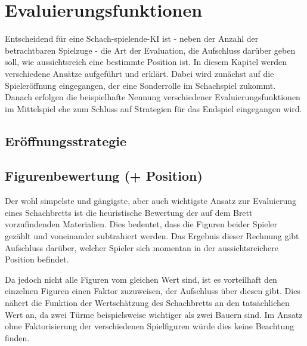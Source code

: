  

   
   

\section{Evaluierungsfunktionen}

Entscheidend für eine Schach-spielende-KI ist - neben der Anzahl der betrachtbaren Spielzuge - die Art der Evaluation, die Aufschluss darüber geben soll, wie aussichtsreich eine bestimmte Position ist. In diesem Kapitel werden verschiedene Ansätze aufgeführt und erklärt. Dabei wird zunächst auf die Spieleröffnung eingegangen, der eine Sonderrolle im Schachspiel zukommt. Danach erfolgen die beispielhafte Nennung verschiedener Evaluierungsfunktionen im Mittelspiel ehe zum Schluss auf Strategien für das Endspiel eingegangen wird.

\subsection{Eröffnungsstrategie}

\subsection{Figurenbewertung (+ Position)}

Der wohl simpelste und gängigste, aber auch wichtigste Ansatz zur Evaluierung eines Schachbretts ist die heuristische Bewertung der auf dem Brett vorzufindenden Materialien. Dies bedeutet, dass die Figuren beider Spieler gezählt und voneinander subtrahiert werden. Das Ergebnis dieser Rechnung gibt Aufschluss darüber, welcher Spieler sich momentan in der aussichtsreichere Position befindet.

Da jedoch nicht alle Figuren vom gleichen Wert sind, ist es vorteilhaft den einzelnen Figuren einen Faktor zuzuweisen, der Aufschluss über diesen gibt. Dies nähert die Funktion der Wertschätzung des Schachbretts an den tatsächlichen Wert an, da zwei Türme beispielsweise wichtiger als zwei Bauern sind. Im Ansatz ohne Faktorisierung der verschiedenen Spielfiguren würde dies keine Beachtung finden.

